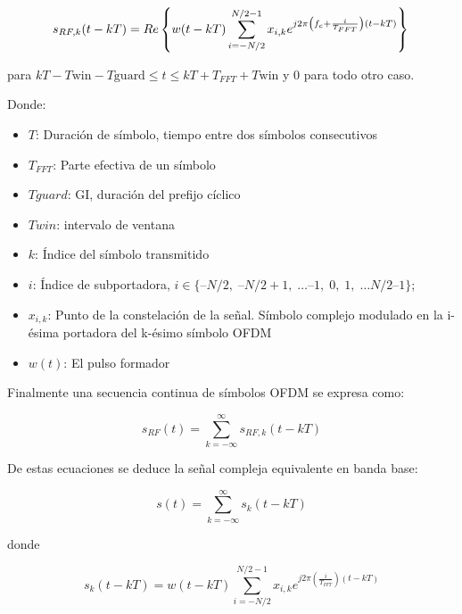 \begin{equation}
s_{RF,k}(t-kT) = 
	Re\left\{ w(t-kT) \sum\limits_{i=-N/2}^{N/2-1} x_{i,k} e^{j2\pi
	\left(f_c+\frac{i}{T_{FFT}}\right)(t-kT)}\right\}\\
\label{eq:OFDM_symbol}
\end{equation}

para $kT-T\text{win}-T\text{guard}\leq t \leq kT+T_{FFT}+T\text{win}$ y $0$ para todo otro caso.

Donde:

\begin{itemize}
\item $T$: Duración de símbolo, tiempo entre dos símbolos consecutivos
\item $T_{FFT}$: Parte efectiva de un símbolo
\item $Tguard$: GI, duración del prefijo cíclico
\item $Twin$: intervalo de ventana
\item $k$: Índice del símbolo transmitido
\item $i$: Índice de subportadora, $i \in \{$$–N/2,\; –N/2+1,\; … –1,\; 0,\; 1,\; …
N/2–1$$\}$;
\item $x_{i,k}$: Punto de la constelación de la señal. Símbolo complejo
modulado en la i-ésima portadora del k-ésimo símbolo OFDM
\item $w(t)$: El pulso formador
\end{itemize}

Finalmente una secuencia continua de símbolos OFDM se expresa como:

\begin{equation}
s_{RF}(t) = \sum_{k=-\infty}^{\infty}s_{RF,k}(t-kT)
\label{eq:OFDM_seq}
\end{equation}

De estas ecuaciones se deduce la señal compleja equivalente en banda base:

\begin{equation}
s(t) = \sum_{k=-\infty}^{\infty}s_{k}(t-kT)
\label{eq:OFDM_low}
\end{equation}

donde

\begin{equation}
s_{k}(t-kT) =
	w(t-kT) \sum\limits_{i=-N/2}^{N/2-1} x_{i,k} e^{j2\pi
	\left(\frac{i}{T_{FFT}}\right)(t-kT)}
\label{eq:OFDM_symbol_low}
\end{equation}


